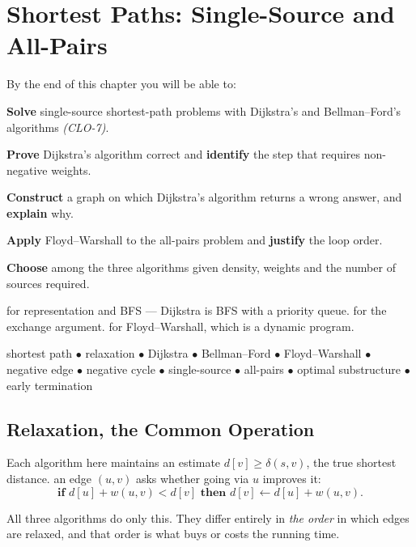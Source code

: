 \chapter{Shortest Paths: Single-Source and All-Pairs}\label{ch:shortestpaths}

\begin{outcomes}
By the end of this chapter you will be able to:
\begin{tight}
  \item \textbf{Solve} single-source shortest-path problems with Dijkstra's and
        Bellman--Ford's algorithms \emph{(CLO-7)}.
  \item \textbf{Prove} Dijkstra's algorithm correct and \textbf{identify} the
        step that requires non-negative weights.
  \item \textbf{Construct} a graph on which Dijkstra's algorithm returns a
        wrong answer, and \textbf{explain} why.
  \item \textbf{Apply} Floyd--Warshall to the all-pairs problem and
        \textbf{justify} the loop order.
  \item \textbf{Choose} among the three algorithms given density, weights and
        the number of sources required.
\end{tight}
\end{outcomes}

\begin{prereq}
 for representation and BFS --- Dijkstra is BFS with a priority
queue.  for the exchange argument.  for
Floyd--Warshall, which is a dynamic program.
\end{prereq}

\begin{keyterms}
shortest path $\bullet$ relaxation $\bullet$ Dijkstra $\bullet$ Bellman--Ford
$\bullet$ Floyd--Warshall $\bullet$ negative edge $\bullet$ negative cycle
$\bullet$ single-source $\bullet$ all-pairs $\bullet$ optimal substructure
$\bullet$ early termination
\end{keyterms}

\section{Relaxation, the Common Operation}

\begin{definitionbox}[Relaxation]
Each algorithm here maintains an estimate $d[v] \ge \delta(s,v)$, the true
shortest distance.  an edge $(u,v)$ asks whether going via $u$
improves it:
\[ \textbf{if } d[u] + w(u,v) < d[v] \textbf{ then } d[v] \gets d[u]+w(u,v). \]

\smallskip
All three algorithms do only this. They differ entirely in \emph{the order} in
which edges are relaxed, and that order is what buys or costs the running time.
\end{definitionbox}

